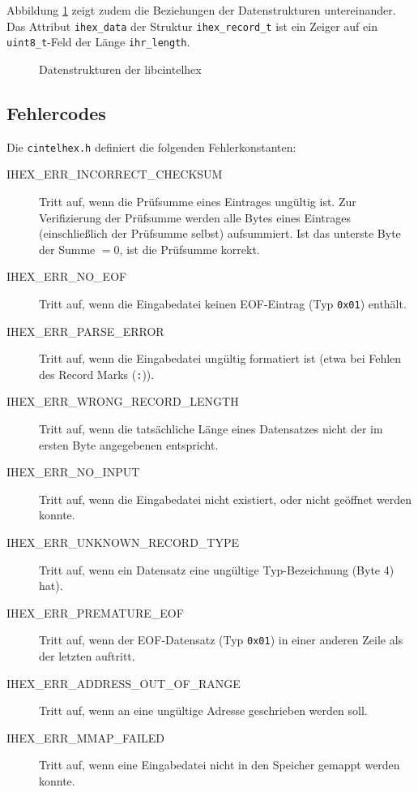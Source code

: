 \documentclass[12pt]{scrartcl}
\begin{document}
Abbildung \ref{lcih_datastructs} zeigt zudem die Beziehungen der Datenstrukturen untereinander. Das Attribut \texttt{ihex\_data} der Struktur \texttt{ihex\_record\_t} ist ein Zeiger auf ein \texttt{uint8\_t}-Feld der Länge \texttt{ihr\_length}.

\begin{figure}[!htb]
	\begin{center}
		
	\end{center}
	\caption{Datenstrukturen der libcintelhex}
	\label{lcih_datastructs}
\end{figure}

\subsection{Fehlercodes}

Die \texttt{cintelhex.h} definiert die folgenden Fehlerkonstanten:

\begin{description}
	\item[IHEX\_ERR\_INCORRECT\_CHECKSUM] Tritt auf, wenn die Prüfsumme eines Eintrages ungültig ist. Zur Verifizierung der Prüfsumme werden alle Bytes eines Eintrages (einschließlich der Prüfsumme selbst) aufsummiert. Ist das unterste Byte der Summe $=0$, ist die Prüfsumme korrekt.
	\item[IHEX\_ERR\_NO\_EOF] Tritt auf, wenn die Eingabedatei keinen EOF-Eintrag (Typ \texttt{0x01}) enthält.
	\item[IHEX\_ERR\_PARSE\_ERROR] Tritt auf, wenn die Eingabedatei ungültig formatiert ist (etwa bei Fehlen des Record Marks (\texttt{:})).
	\item[IHEX\_ERR\_WRONG\_RECORD\_LENGTH] Tritt auf, wenn die tatsächliche Länge eines Datensatzes nicht der im ersten Byte angegebenen entspricht.
	\item[IHEX\_ERR\_NO\_INPUT] Tritt auf, wenn die Eingabedatei nicht existiert, oder nicht geöffnet werden konnte.
	\item[IHEX\_ERR\_UNKNOWN\_RECORD\_TYPE] Tritt auf, wenn ein Datensatz eine ungültige Typ-Bezeichnung (Byte 4) hat).
	\item[IHEX\_ERR\_PREMATURE\_EOF] Tritt auf, wenn der EOF-Datensatz (Typ \texttt{0x01}) in einer anderen Zeile als der letzten auftritt.
	\item[IHEX\_ERR\_ADDRESS\_OUT\_OF\_RANGE] Tritt auf, wenn an eine ungültige Adresse geschrieben werden soll.
	\item[IHEX\_ERR\_MMAP\_FAILED] Tritt auf, wenn eine Eingabedatei nicht in den Speicher gemappt werden konnte.
\end{description}
\end{document}
